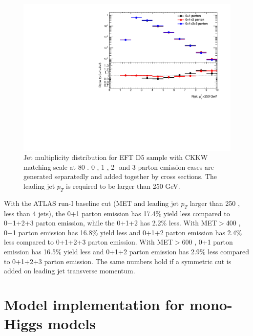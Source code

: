 \begin{figure}[h!]
	\centering  
	\includegraphics[width=0.8\linewidth]{figures/monojet_appendix/h_njet250.pdf}
	\caption{Jet multiplicity distribution for EFT D5 sample with CKKW matching scale at 80 \gev. 0-, 1-, 2- and 3-parton emission cases are generated separatedly and added together by cross sections. The leading jet $p_{T}$ is required to be larger than 250 GeV.}
	\label{fig:RatioKine_D5_2}
\end{figure}

With the ATLAS run-I baseline cut (MET and leading jet $p_{T}$ larger than 250 \gev, less than 4 jets), the 0+1 parton emission has 17.4\% yield less compared to 0+1+2+3 parton emission, while the 0+1+2 has 2.2\% less. With MET$>$400 \gev, 0+1 parton emission has 16.8\% yield less and 0+1+2 parton emission has 2.4\% less compared to 0+1+2+3 parton emission. With MET$>$600 \gev, 0+1 parton emission has 16.5\% yield less and 0+1+2 parton emission has 2.9\% less compared to 0+1+2+3 parton emission. The same numbers hold if a symmetric cut is added on leading jet transverse momentum.


\section{Model implementation for mono-Higgs models}

